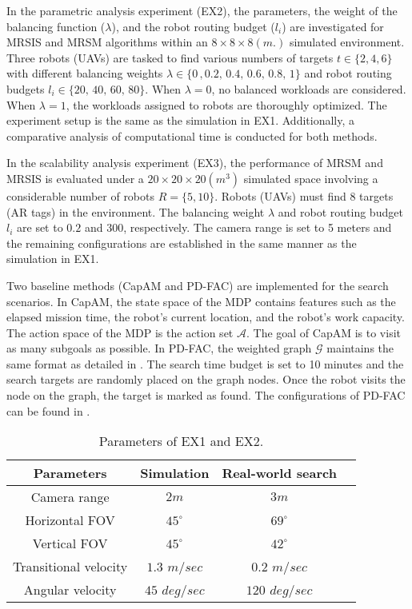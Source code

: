 In the parametric analysis experiment (EX2), the parameters, the weight of the balancing function ($\lambda$), and the robot routing budget ($l_i$) are investigated for MRSIS\cite{li2024mrsis} and MRSM algorithms within an $8\times8\times8 (m.)$ simulated environment.
Three robots (UAVs) are tasked to find various numbers of targets $t \in \{2,4,6\}$ with different balancing weights $\lambda\in\{0\,,0.2,\,0.4,\,0.6,\,0.8,\,1\}$ and robot routing budgets $l_i\in\{20,\, 40,\, 60,\, 80\}$.
When $\lambda=0$, no balanced workloads are considered.
When $\lambda=1$, the workloads assigned to robots are thoroughly optimized.
The experiment setup is the same as the simulation in EX1.
Additionally, a comparative analysis of computational time is conducted for both methods.

In the scalability analysis experiment (EX3), the performance of MRSM and MRSIS\cite{li2024mrsis} is evaluated under a
$20\times20\times20(m^3)$ simulated space involving a considerable number of robots $R=\{5, 10\}$.
Robots (UAVs) must find 8 targets (AR tags) in the environment.
The balancing weight $\lambda$ and robot routing budget $l_i$ are set to $0.2$ and $300$, respectively.
The camera range is set to 5 meters and the remaining configurations are established in the same manner as the simulation in EX1.

Two baseline methods (CapAM\cite{paull2022learning} and PD-FAC\cite{sheng2022pd}) are implemented for the search scenarios. In CapAM\cite{paull2022learning}, the state space of the MDP contains features such as the elapsed mission time, the robot's current location, and the robot's work capacity. The action space of the MDP is the action set $\mathcal{A}$. The goal of CapAM\cite{paull2022learning} is to visit as many subgoals as possible.
In PD-FAC\cite{sheng2022pd}, the weighted graph $\mathcal{G}$ maintains the same format as detailed in \cite{sheng2022pd}. The search time budget is set to 10 minutes and the search targets are randomly placed on the graph nodes. Once the robot visits the node on the graph, the target is marked as found. The configurations of PD-FAC can be found in \cite{sheng2022pd}.

\renewcommand{\arraystretch}{1.3}
\begin{table}[h]
\caption{Parameters of EX1 and EX2.}
\begin{center}
\begin{tabular}{|c||c|c|c|}
\hline
Parameters & Simulation & Real-world search \\
\hline\hline
Camera range & $2m$ & $3m$  \\
\hline
Horizontal FOV & $45^{\circ}$ & $69^{\circ}$  \\
\hline
Vertical FOV & $45^{\circ}$ & $42^{\circ}$ \\
\hline
Transitional velocity & $1.3$ $m/sec$ & $0.2$ $m/sec$ \\
\hline
Angular velocity & $45$ $deg/sec$ & $120$ $deg/sec$ \\
\hline
\end{tabular}
\label{Tab:parameters}
\end{center}
\end{table}


